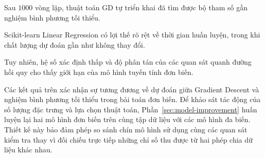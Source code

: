 Sau $1000$ vòng lặp, thuật toán GD
tự triển khai đã tìm được bộ tham số
gần nghiệm bình phương tối thiểu.

Scikit-learn Linear Regression có lợi thế
rõ rệt về thời gian huấn luyện,
trong khi chất lượng dự đoán
gần như không thay đổi.

Tuy nhiên, hệ số xác định thấp
và độ phân tán của các quan sát
quanh đường hồi quy cho thấy giới hạn
của mô hình tuyến tính đơn biến.




Các kết quả trên xác nhận sự tương đương về dự đoán giữa
Gradient Descent và nghiệm bình phương tối thiểu trong bài toán
đơn biến. Để khảo sát tác động của số lượng đặc trưng và lựa chọn
thuật toán, Phần~\ref{sec:model-improvement} huấn luyện lại hai
mô hình đơn biến trên cùng tập dữ liệu với các mô hình đa biến.
Thiết kế này bảo đảm phép so sánh chín mô hình sử dụng cùng các
quan sát kiểm tra thay vì đối chiếu trực tiếp những chỉ số thu
được từ hai phép chia dữ liệu khác nhau.